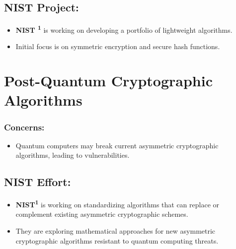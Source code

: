 \subsection{NIST Project:}
\begin{itemize}
    \item \textbf{NIST \textsuperscript{1}} is working on developing a portfolio of lightweight algorithms.
    \item Initial focus is on symmetric encryption and secure hash functions.
\end{itemize}

\section{Post-Quantum Cryptographic Algorithms}

\subsubsection{Concerns:}
\begin{itemize}
    \item Quantum computers may break current asymmetric cryptographic algorithms, leading to vulnerabilities.
\end{itemize}

\subsection{NIST Effort:}
\begin{itemize}
    \item \textbf{NIST\textsuperscript{1}} is working on standardizing algorithms that can replace or complement existing asymmetric cryptographic schemes.
    \item They are exploring mathematical approaches for new asymmetric cryptographic algorithms resistant to quantum computing threats.
\end{itemize}
